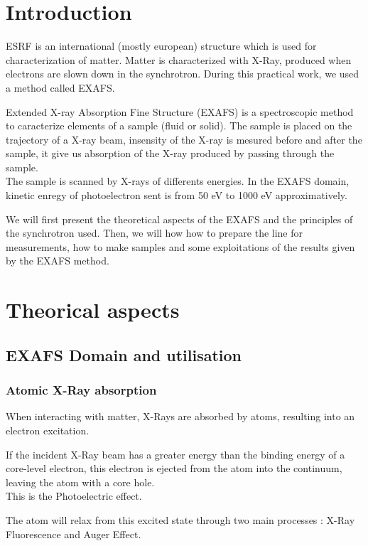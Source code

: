 \documentclass[11pt,a4paper,oneside]{report}
\begin{document}

\pagestyle{fancy}

\chapter*{Introduction}
ESRF is an international (mostly european) structure which is used for characterization of matter. Matter is characterized with X-Ray, produced when electrons are slown down in the synchrotron. During this practical work, we used a method called EXAFS.

Extended X-ray Absorption Fine Structure (EXAFS) is a spectroscopic method to caracterize elements of a sample (fluid or solid). The sample is placed on the trajectory of a X-ray beam, insensity of the X-ray is mesured before and after the sample, it give us absorption of the X-ray produced by passing through the sample.\\
The sample is scanned by X-rays of differents energies. In the EXAFS domain, kinetic enregy of photoelectron sent is from 50 eV to 1000 eV approximatively.

We will first present the theoretical aspects of the EXAFS and the principles of the synchrotron used. Then, we will how how to prepare the line for measurements, how to make samples and some exploitations of the results given by the EXAFS method.

\newpage

\chapter{Theorical aspects}
\section{EXAFS Domain and utilisation}
\subsection{Atomic X-Ray absorption}\label{theory}
When interacting with matter, X-Rays are absorbed by atoms, resulting into an electron excitation.

If the incident X-Ray beam has a greater energy than the binding energy of a core-level electron, this electron is ejected from the atom into the continuum, leaving the atom with a core hole.\\This is the Photoelectric effect.

The atom will relax from this excited state through two main processes : X-Ray Fluorescence and Auger Effect.
\end{document}
